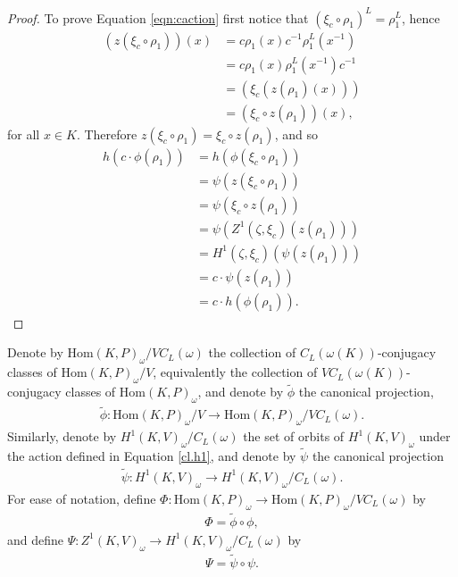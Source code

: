 \begin{proof}
		To prove Equation \ref{eqn:caction} first notice that $\left(\xi_c \circ \rho_1\right)^L = \rho_1^L$, hence
		\begin{align*}
			(z(\xi_c \circ \rho_1))(x) &= c\rho_1(x)c^{-1}\rho_1^L(x^{-1}) \\
				&= c\rho_1(x)\rho_1^L(x^{-1})c^{-1} \\
				&= \left(\xi_c ( z(\rho_1)(x))\right) \\
				&= (\xi_c \circ z(\rho_1))(x),
		\end{align*}
		for all $x \in K$. Therefore $z\left(\xi_c \circ \rho_1\right) = \xi_c\circ z(\rho_1)$, and so
		\begin{align*}
			h(c \cdot \phi(\rho_1)) &= h(\phi(\xi_c \circ \rho_1)) \\
			&= \psi(z(\xi_c\circ\rho_1)) \\
			&= \psi(\xi_c\circ z(\rho_1)) \\
			&= \psi\left(Z^1(\zeta, \xi_c)(z(\rho_1))\right) \\
			&= H^1(\zeta, \xi_c)(\psi(z(\rho_1))) \\
			&= c \cdot \psi(z(\rho_1)) \\
			&= c \cdot h(\phi(\rho_1)).
		\end{align*}
\end{proof}
	\begin{definition}
		Denote by $\mathrm{Hom}(K, P)_\omega/VC_L(\omega)$ the collection of $C_L(\omega(K))$-conjugacy classes of $\mathrm{Hom}(K, P)_\omega/V$, equivalently the collection of $VC_L(\omega(K))$-conjugacy classes of $\mathrm{Hom}(K, P)_\omega$, and denote by $\widetilde{\phi}$ the canonical projection,
		\begin{align*}
			\widetilde{\phi}: \mathrm{Hom}(K, P)_\omega/V \rightarrow \mathrm{Hom}(K, P)_\omega/VC_L(\omega).
		\end{align*}
		Similarly, denote by $H^1(K, V)_\omega/C_L(\omega)$ the set of orbits of $H^1(K, V)_\omega$ under the action defined in Equation \ref{cl.h1}, and denote by $\widetilde{\psi}$ the canonical projection
		\begin{align*}
			\widetilde{\psi}:H^1(K, V)_\omega \rightarrow H^1(K, V)_\omega/C_L(\omega).
		\end{align*}
	For ease of notation, define $\Phi:\mathrm{Hom}(K, P)_\omega \rightarrow \mathrm{Hom}(K, P)_\omega/VC_L(\omega)$ by
	\begin{align*}
		\Phi = \widetilde{\phi} \circ \phi,
	\end{align*}
	and define $\Psi:Z^1(K, V)_\omega \rightarrow H^1(K, V)_\omega/C_L(\omega)$ by
	\begin{align*}
		\Psi = \widetilde{\psi} \circ \psi.
	\end{align*}
	\end{definition}

